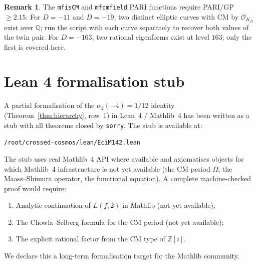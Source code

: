 \documentclass[12pt]{amsart}
\theoremstyle{definition}
\newtheorem{remark}[theorem]{Remark}
\newcommand{\Q}{\mathbb{Q}}
\newcommand{\Z}{\mathbb{Z}}
\newcommand{\OK}{\mathcal{O}_K}
\newcommand{\Omega}{\varOmega}
\begin{document}
\begin{remark}
  The \texttt{mfisCM} and \texttt{mfcmfield} PARI functions require
  PARI/GP $\geq 2.15$.
  For $D = -11$ and $D = -19$, two distinct elliptic curves with CM by
  $\OK_D$ exist over $\Q$; run the script with each curve separately to
  recover both values of the twin pair.
  For $D = -163$, two rational eigenforms exist at level $163$; only the
  first is covered here.
\end{remark}

\section{Lean 4 formalisation stub}
\label{sec:lean}

A partial formalisation of the $\alpha_2(-4) = 1/12$ identity
(Theorem~\ref{thm:hierarchy}, row~1) in Lean~4 / Mathlib~4 has been
written as a stub with all theorems closed by \texttt{sorry}.
The stub is available at:
\begin{center}
  \texttt{/root/crossed-cosmos/lean/EciM142.lean}
\end{center}
The stub uses real Mathlib~4 API where available and axiomatises objects
for which Mathlib~4 infrastructure is not yet available (the CM period
$\Omega$, the Maass--Shimura operator, the functional equation).
A complete machine-checked proof would require:
\begin{enumerate}
  \item Analytic continuation of $L(f,2)$ in Mathlib (not yet available);
  \item The Chowla--Selberg formula for the CM period (not yet available);
  \item The explicit rational factor from the CM type of $\Z[i]$.
\end{enumerate}
We declare this a long-term formalisation target for the Mathlib community.
\end{document}
